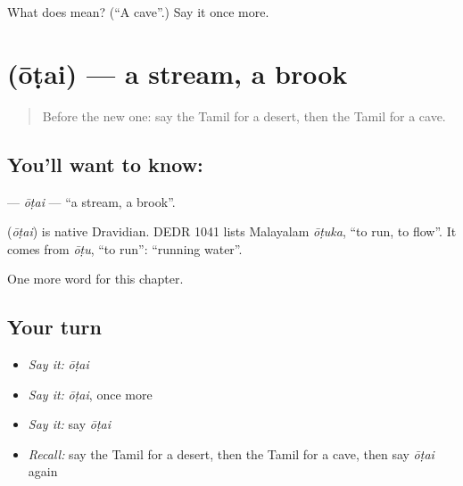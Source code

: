 \begin{tcolorbox}[breakable,colback=teal!4,colframe=teal!35!black,title={Before you move on}]
What does  mean? (\textquotedblleft{}A cave\textquotedblright{}.) Say it once more.
\end{tcolorbox}
\section[\texorpdfstring{\ta{ஓடை} (ōṭai)}{ஓடை (ōṭai)}]{ (ōṭai) — a stream, a brook}

\label{lesson:TA-C175-otai}



\begin{quote}
Before the new one: say the Tamil for a desert, then the Tamil for a cave.
\end{quote}

\subsection*{You'll want to know: }
\textbf{} — \emph{ōṭai} — \textquotedblleft{}a stream, a brook\textquotedblright{}.

\begin{cousinweb}
\textbf{} (\emph{ōṭai}) is native Dravidian. DEDR 1041 lists Malayalam \emph{ōṭuka}, \textquotedblleft{}to run, to flow\textquotedblright{}. It comes from \emph{ōṭu}, \textquotedblleft{}to run\textquotedblright{}: \textquotedblleft{}running water\textquotedblright{}.
\end{cousinweb}

\begin{grammarlens}[title={What you've built}]
One more word for this chapter.
\end{grammarlens}

\subsection*{Your turn}
\begin{itemize}
\raggedright
  \item \emph{Say it:} \emph{ōṭai}
  \item \emph{Say it:} \emph{ōṭai}, once more
  \item \emph{Say it:} say \emph{ōṭai}
  \item \emph{Recall:} say the Tamil for a desert, then the Tamil for a cave, then say \emph{ōṭai} again
\end{itemize}

